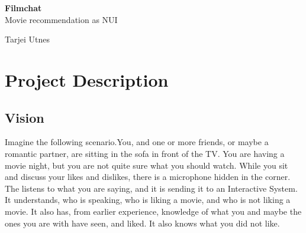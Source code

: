 \documentclass[11pt,fleqn]{book} %
\begin{document}

\begingroup
\thispagestyle{empty}
\centering
\vspace*{5cm}
\par\normalfont\fontsize{32}{32}\sffamily\selectfont
\textbf{Filmchat}\\
{\LARGE Movie recommendation as NUI}\par %
\vspace*{1cm}
{\Huge Tarjei Utnes}\par %
\endgroup



\pagestyle{empty} %

\tableofcontents %


\pagestyle{fancy} %



\chapter{Project Description}
\section{Vision}
Imagine the following scenario.You, and one or more friends, or maybe a romantic partner, are sitting in the sofa in front of the TV. You are having a movie night, but you are not quite sure what you should watch. While you sit and discuss your likes and dislikes, there is a microphone hidden in the corner. The listens to what you are saying, and it is sending it to an Interactive System. It understands, who is speaking, who is liking a movie, and who is not liking a movie. It also has, from earlier experience, knowledge of what you and maybe the ones you are with have seen, and liked. It also knows what you did not like.
\end{document}
